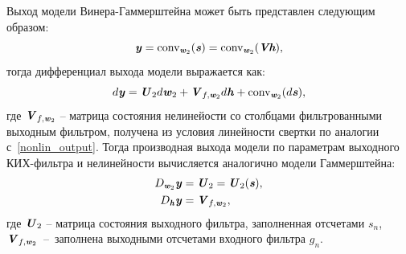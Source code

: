Выход модели Винера-Гаммерштейна может быть представлен следующим образом:
\begin{equation}
	\textbf{\textit{y}}=\text{conv}_{\textbf{\textit{w}}_2}(\textbf{\textit{s}})=\text{conv}_{\textbf{\textit{w}}_2}(\textbf{\textit{\ensuremath{\textbf{\textit{V}}}\ensuremath{\textbf{\textit{h}}}}}),
	\label{wiener_hammerstein_output_vector}
\end{equation}
тогда дифференциал выхода модели выражается как:
\begin{equation}
	d\textbf{\textit{y}}=\textbf{\textit{U}}_2d\textbf{\textit{w}}_2+\textbf{\textit{V}}_{f,\textbf{\textit{w}}_2}d\textbf{\textit{h}}+\text{conv}_{\textbf{\textit{w}}_2}(d\textbf{\textit{s}}),
	\label{wiener_hammerstein_output_diff}
\end{equation}
где $\textbf{\textit{V}}_{f,\textbf{\textit{w}}_2}$ -- матрица состояния нелинейости со столбцами фильтрованными выходным фильтром, получена из условия линейности свертки по аналогии с~\eqref{nonlin_output}. Тогда производная выхода модели по параметрам выходного КИХ-фильтра и нелинейности вычисляется аналогично модели Гаммерштейна:
\begin{align}
	D_{\textbf{\textit{w}}_2}\textbf{\textit{y}}&=\textbf{\textit{U}}_2=\textbf{\textit{U}}_2(\textbf{\textit{s}}), 	\label{wiener_hammerstein_jac_fir_out} \\
	D_{\textbf{\textit{h}}}\textbf{\textit{y}}&=\textbf{\textit{V}}_{f,\textbf{\textit{w}}_2}, 	\label{wiener_hammerstein_jac_nonlin}
\end{align}
где $\textbf{\textit{U}}_2$ -- матрица состояния выходного фильтра, заполненная отсчетами $s_n$, $\textbf{\textit{V}}_{f,\textbf{\textit{w}}_2}$~--~заполнена выходными отсчетами входного фильтра $g_n$.

